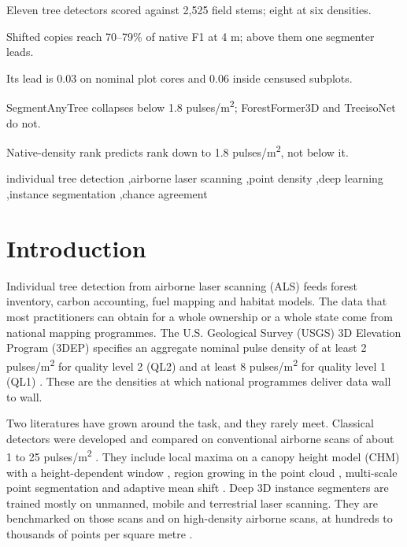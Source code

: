 \documentclass[preprint,12pt,authoryear,a4paper]{elsarticle}
\begin{document}
\begin{frontmatter}
\begin{highlights}
\item Eleven tree detectors scored against 2,525 field stems; eight at six densities.
\item Shifted copies reach 70--79\% of native F1 at 4 m; above them one segmenter leads.
\item Its lead is 0.03 on nominal plot cores and 0.06 inside censused subplots.
\item SegmentAnyTree collapses below 1.8 pulses/m\textsuperscript{2}; ForestFormer3D and TreeisoNet do not.
\item Native-density rank predicts rank down to 1.8 pulses/m\textsuperscript{2}, not below it.
\end{highlights}

\begin{keyword}
individual tree detection \sep airborne laser scanning \sep point density \sep deep learning \sep instance segmentation \sep chance agreement
\end{keyword}

\end{frontmatter}

\linenumbers

\section{Introduction}\label{sec:1}

Individual tree detection from airborne laser scanning (ALS) feeds forest
inventory, carbon accounting, fuel mapping and habitat models. The data that
most practitioners can obtain for a whole ownership or a whole state come from
national mapping programmes. The U.S. Geological Survey (USGS) 3D Elevation
Program (3DEP) specifies an aggregate nominal pulse density of at least 2
pulses/m\textsuperscript{2} for quality level 2 (QL2) and at least 8 pulses/m\textsuperscript{2} for quality level 1
(QL1) \citep{usgs2026topographic}. These are the densities at which national
programmes deliver data wall to wall.

Two literatures have grown around the task, and they rarely meet. Classical
detectors were developed and compared on conventional airborne scans of about 1
to 25 pulses/m\textsuperscript{2} \citep{kaartinen2012international,jakubowski2013tradeoffs,sparks2022crosscomparison}. They include local maxima on a canopy height model
(CHM) with a height-dependent window \citep{popescu2004seeing}, region growing in the
point cloud \citep{li2012new}, multi-scale point segmentation \citep{vega2014ptrees} and
adaptive mean shift \citep{ferraz2016lidar}. Deep 3D instance segmenters
\citep{wielgosz2024segmentanytree,xiang2025forestformer3d,xi2025new} are trained
mostly on unmanned, mobile and terrestrial laser scanning. They are benchmarked
on those scans and on high-density airborne scans, at hundreds to thousands of
points per square metre \citep{puliti2023forinstance,ruoppa2026benchmarking}.
\end{document}
